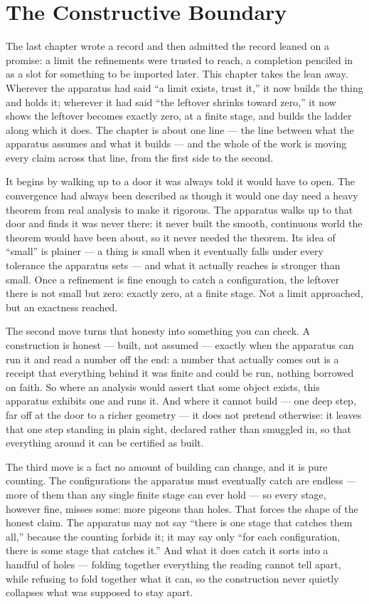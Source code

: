 \chapter{The Constructive Boundary}

The last chapter wrote a record and then admitted the record leaned on a promise: a limit the refinements were trusted to reach, a completion penciled in as a slot for something to be imported later. This chapter takes the lean away. Wherever the apparatus had said ``a limit exists, trust it,'' it now builds the thing and holds it; wherever it had said ``the leftover shrinks toward zero,'' it now shows the leftover becomes exactly zero, at a finite stage, and builds the ladder along which it does. The chapter is about one line --- the line between what the apparatus assumes and what it builds --- and the whole of the work is moving every claim across that line, from the first side to the second.

It begins by walking up to a door it was always told it would have to open. The convergence had always been described as though it would one day need a heavy theorem from real analysis to make it rigorous. The apparatus walks up to that door and finds it was never there: it never built the smooth, continuous world the theorem would have been about, so it never needed the theorem. Its idea of ``small'' is plainer --- a thing is small when it eventually falls under every tolerance the apparatus sets --- and what it actually reaches is stronger than small. Once a refinement is fine enough to catch a configuration, the leftover there is not small but zero: exactly zero, at a finite stage. Not a limit approached, but an exactness reached.

The second move turns that honesty into something you can check. A construction is honest --- built, not assumed --- exactly when the apparatus can run it and read a number off the end: a number that actually comes out is a receipt that everything behind it was finite and could be run, nothing borrowed on faith. So where an analysis would assert that some object exists, this apparatus exhibits one and runs it. And where it cannot build --- one deep step, far off at the door to a richer geometry --- it does not pretend otherwise: it leaves that one step standing in plain sight, declared rather than smuggled in, so that everything around it can be certified as built.

The third move is a fact no amount of building can change, and it is pure counting. The configurations the apparatus must eventually catch are endless --- more of them than any single finite stage can ever hold --- so every stage, however fine, misses some: more pigeons than holes. That forces the shape of the honest claim. The apparatus may not say ``there is one stage that catches them all,'' because the counting forbids it; it may say only ``for each configuration, there is some stage that catches it.'' And what it does catch it sorts into a handful of holes --- folding together everything the reading cannot tell apart, while refusing to fold together what it can, so the construction never quietly collapses what was supposed to stay apart.

